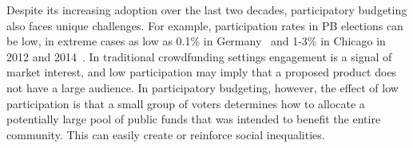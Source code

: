 \documentclass[mnsc,blindrev]{informs3_freeuse} %
\begin{document}
Despite  its increasing adoption over the last two decades, participatory budgeting also faces  unique challenges. 
For example, participation rates in PB elections can be low, in  extreme cases as low as 0.1\% in Germany~\citep{zepic2017participatory} and 1-3\%   in Chicago in 2012 and 2014~\citep{stewart2014participatory,carroll2016democratizing}. In traditional crowdfunding settings engagement is a signal of market interest, and low participation may imply that a proposed product does not have a large audience.   
In participatory budgeting, however, the effect of low   participation is that a small group of voters   determines how to allocate a potentially large pool of public funds that was intended to benefit the entire community. This can easily create or reinforce social inequalities. 

\end{document}
